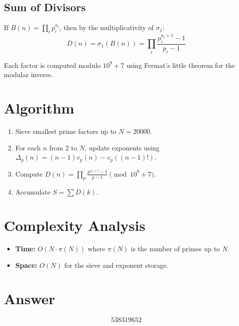 \documentclass[12pt]{article}
\begin{document}
\subsection{Sum of Divisors}

If $B(n) = \prod_{i} p_i^{a_i}$, then by the multiplicativity of $\sigma_1$:
\[
D(n) = \sigma_1(B(n)) = \prod_{i} \frac{p_i^{a_i+1} - 1}{p_i - 1}
\]

Each factor is computed modulo $10^9+7$ using Fermat's little theorem for the modular inverse.

\section{Algorithm}

\begin{enumerate}
\item Sieve smallest prime factors up to $N = 20000$.
\item For each $n$ from 2 to $N$, update exponents using $\Delta_p(n) = (n-1)v_p(n) - v_p((n-1)!)$.
\item Compute $D(n) = \prod_p \frac{p^{e_p+1}-1}{p-1} \pmod{10^9+7}$.
\item Accumulate $S = \sum D(k)$.
\end{enumerate}

\section{Complexity Analysis}

\begin{itemize}
\item \textbf{Time:} $O(N \cdot \pi(N))$ where $\pi(N)$ is the number of primes up to $N$.
\item \textbf{Space:} $O(N)$ for the sieve and exponent storage.
\end{itemize}

\section{Answer}

\[
\boxed{538319652}
\]
\end{document}

